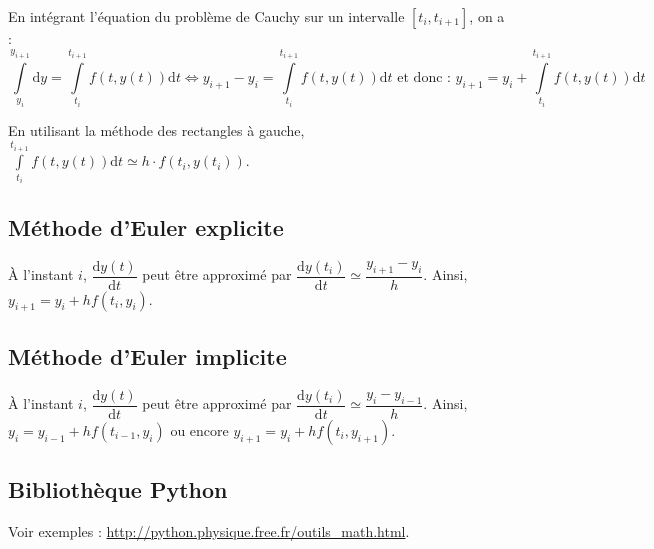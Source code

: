 \documentclass[10pt,fleqn]{article} %
\begin{document}
\begin{resultat}
En intégrant l'équation du problème de Cauchy sur un intervalle $[t_i, t_{i+1}]$, on a : 
$$
\int\limits_{y_i}^{y_{i+1}} \text{d}y = \int\limits_{t_i}^{t_{i+1}} f(t,y(t)) \text{d}t 
\Longleftrightarrow 
y_{i+1} - y_i = \int\limits_{t_i}^{t_{i+1}} f(t,y(t)) \text{d}t  \text{ et donc : }  y_{i+1}= y_i + \int\limits_{t_i}^{t_{i+1}} f(t,y(t)) \text{d}t 
$$

 En utilisant la méthode des rectangles à gauche, $\int\limits_{t_i}^{t_{i+1}} f(t,y(t)) \text{d}t  \simeq h \cdot f(t_i,y(t_i)) $.

\end{resultat}


\subsection*{Méthode d'Euler explicite}

À l'instant $i$, $\dfrac{\text{d}y(t)}{\text{d}t}$ peut être approximé par 
$\dfrac{\text{d}y(t_i)}{\text{d}t} \simeq \dfrac{y_{i+1}-y_i}{h}$.
Ainsi, $y_{i+1} = y_i +h  f(t_i,y_i)$.

\subsection*{Méthode d'Euler implicite}
À l'instant $i$, $\dfrac{\text{d}y(t)}{\text{d}t}$ peut être approximé par 
$\dfrac{\text{d}y(t_{i})}{\text{d}t} \simeq \dfrac{y_{i}-y_{i-1}}{h}$.
Ainsi, $y_{i} = y_{i-1} +h  f(t_{i-1},y_{i})$ ou encore $y_{i+1} = y_{i} +h  f(t_{i},y_{i+1})$.
\subsection*{Bibliothèque Python}

Voir exemples : \url{http://python.physique.free.fr/outils_math.html}.
\newpage
\end{document}

